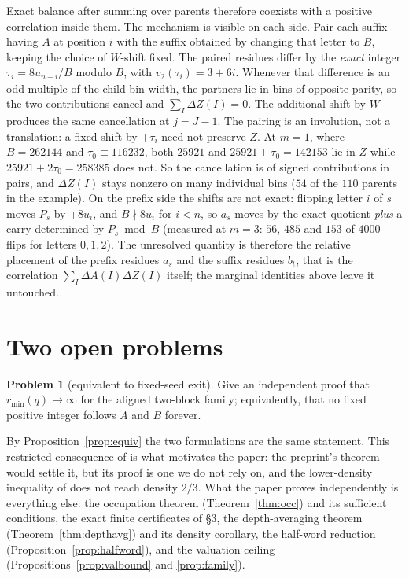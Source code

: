 \documentclass[11pt,a4paper]{article}
\theoremstyle{plain}
\theoremstyle{definition}
\newtheorem{problem}{Problem}
\theoremstyle{remark}
\begin{document}
Exact balance after summing over parents therefore coexists with a positive
correlation inside them. The mechanism is visible on each side. Pair each suffix having $A$ at
position $i$ with the suffix obtained by changing that letter to $B$, keeping
the choice of $W$-shift fixed. The paired residues differ by the \emph{exact}
integer $\tau_i=8u_{n+i}/B$ modulo $B$, with $v_2(\tau_i)=3+6i$. Whenever that
difference is an odd multiple of the child-bin width, the partners lie in bins
of opposite parity, so the two contributions cancel and $\sum_I\Delta Z(I)=0$.
The additional shift by $W$ produces the same cancellation at $j=J-1$. The
pairing is an involution, not a translation: a fixed shift by $+\tau_i$ need
not preserve $Z$. At $m=1$, where $B=262144$ and $\tau_0\equiv116232$, both
$25921$ and $25921+\tau_0=142153$ lie in $Z$ while $25921+2\tau_0=258385$ does
not. So the cancellation is of signed contributions in pairs, and
$\Delta Z(I)$ stays nonzero on many individual bins ($54$ of the $110$ parents
in the example). On the prefix side the shifts are not exact: flipping letter
$i$ of $s$ moves $P_s$ by $\mp8u_i$, and $B\nmid 8u_i$ for $i<n$, so $a_s$ moves
by the exact quotient \emph{plus} a carry determined by $P_s\bmod B$ (measured
at $m=3$: $56$, $485$ and $153$ of $4000$ flips for letters $0,1,2$). The
unresolved quantity is therefore the relative placement of the prefix residues
$a_s$ and the suffix residues $b_t$, that is the correlation
$\sum_I\Delta A(I)\Delta Z(I)$ itself; the marginal identities above leave it
untouched.

\section{Two open problems}

\begin{problem}[equivalent to fixed-seed exit]
Give an independent proof that $r_{\min}(q)\to\infty$ for the aligned two-block
family; equivalently, that no fixed positive integer follows $A$ and $B$
forever.
\end{problem}

By Proposition~\ref{prop:equiv} the two formulations are the same statement.
This restricted consequence of \cite[Theorem 1]{LopezStoll2021} is what
motivates the paper: the preprint's theorem would settle it, but its proof is
one we do not rely on, and the lower-density inequality of
\cite[Theorem 2.7(b)]{MonksYazinski2004} does not reach density $2/3$. What the
paper proves independently is everything else: the occupation theorem
(Theorem~\ref{thm:occ}) and its sufficient conditions, the exact finite
certificates of \S3, the depth-averaging theorem
(Theorem~\ref{thm:depthavg}) and its density corollary, the half-word
reduction (Proposition~\ref{prop:halfword}), and the valuation ceiling
(Propositions~\ref{prop:valbound} and \ref{prop:family}).
\end{document}
